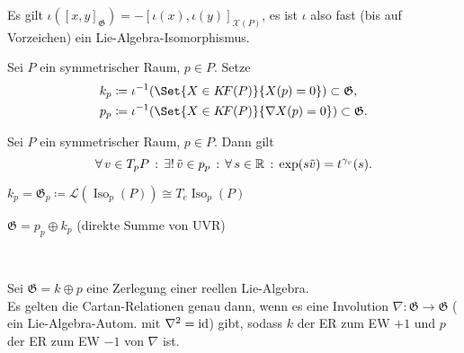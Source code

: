 \documentclass{cheat-sheet}
\DeclareMathOperator{\Iso}{Iso} %
\newcommand{\Gie}{\mathfrak{G}} %
\newcommand{\KF}{K\!F} %
\newcommand{\VF}{\mathcal{X}} %
\begin{document}
\begin{acht}
  Es gilt $\iota([x, y]_\Gie) = - [\iota(x), \iota(y)]_{\VF(P)}$, es ist $\iota$ also fast (bis auf Vorzeichen) ein Lie-Algebra-Isomorphismus.
\end{acht}

\begin{defn}
  Sei $P$ ein symmetrischer Raum, $p \in P$. Setze
  \begin{align*}
    k_p & \coloneqq \iota^{-1}(\Set{X \in \KF(P)}{X(p) = 0}) \subset \Gie, \\
    p_p & \coloneqq \iota^{-1}(\Set{X \in \KF(P)}{\nabla X(p) = 0}) \subset \Gie.
  \end{align*}
\end{defn}

\begin{lem}
  Sei $P$ ein symmetrischer Raum, $p \in P$. Dann gilt
  \[ \forall \, {v \in T_p P} \,:\, \exists! \, {\tilde{v} \in p_p} \,:\, \forall \, {s \in \mathbb{R}} \,:\, \exp(s \tilde{v}) = t^{\gamma_v}(s). \]
\end{lem}


\begin{prop}
  $k_p = \mathfrak{G}_p \coloneqq \mathcal{L}(\Iso_p(P)) \cong T_e \Iso_p(P)$
\end{prop}

\iffalse
\begin{lem}
  $p_p \cap k_p = \{ 0 \}$
\end{lem}
\fi

\begin{prop}
  $\Gie = p_p \oplus k_p$ (direkte Summe von UVR)
\end{prop}

\begin{prop}\mbox{}\\
  \inlineitem{$[k_p, k_p]_\Gie \subseteq k_p$} \quad
  \inlineitem{$[k_p, p_p]_\Gie \subseteq p_p$} \quad
  \inlineitem{$[p_p, p_p]_\Gie \subseteq k_p$}
\end{prop}

\begin{prop}
  Sei $\Gie = k \oplus p$ eine Zerlegung einer reellen Lie-Algebra. \\
  Es gelten die Cartan-Relationen genau dann, wenn es eine Involution $\nabla : \Gie \to \Gie$ (\dh{} ein Lie-Algebra-Autom. mit $\nabla^2 = \operatorname{id}$) gibt, sodass $k$ der ER zum EW $+1$ und $p$ der ER zum EW $-1$ von $\nabla$ ist.
\end{prop}
\end{document}
